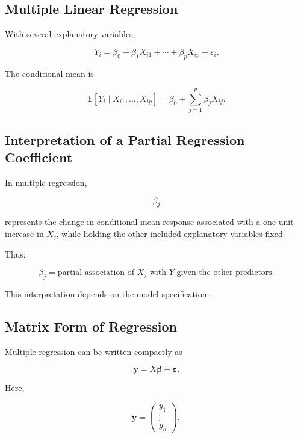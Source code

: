 \subsection{Multiple Linear Regression}
\label{subsec:multiple-linear-regression}

With several explanatory variables,

\[
\boxed{
Y_i
=
\beta_0
+
\beta_1X_{i1}
+
\cdots
+
\beta_pX_{ip}
+
\varepsilon_i.
}
\]

The conditional mean is

\[
\boxed{
\mathbb{E}
[
Y_i
\mid
X_{i1},\ldots,X_{ip}
]
=
\beta_0
+
\sum_{j=1}^{p}
\beta_jX_{ij}.
}
\]

\subsection{Interpretation of a Partial Regression Coefficient}
\label{subsec:partial-regression-coefficient}

In multiple regression,

\[
\beta_j
\]

represents the change in conditional mean response associated with a
one-unit increase in \(X_j\), while holding the other included
explanatory variables fixed.

Thus:

\[
\boxed{
\beta_j
=
\text{partial association of }X_j\text{ with }Y
\text{ given the other predictors}.
}
\]

This interpretation depends on the model specification.

\subsection{Matrix Form of Regression}
\label{subsec:matrix-form-regression}

Multiple regression can be written compactly as

\[
\boxed{
\mathbf{y}
=
X\boldsymbol{\beta}
+
\boldsymbol{\varepsilon}.
}
\]

Here,

\[
\mathbf{y}
=
\begin{pmatrix}
y_1\\
\vdots\\
y_n
\end{pmatrix},
\]

